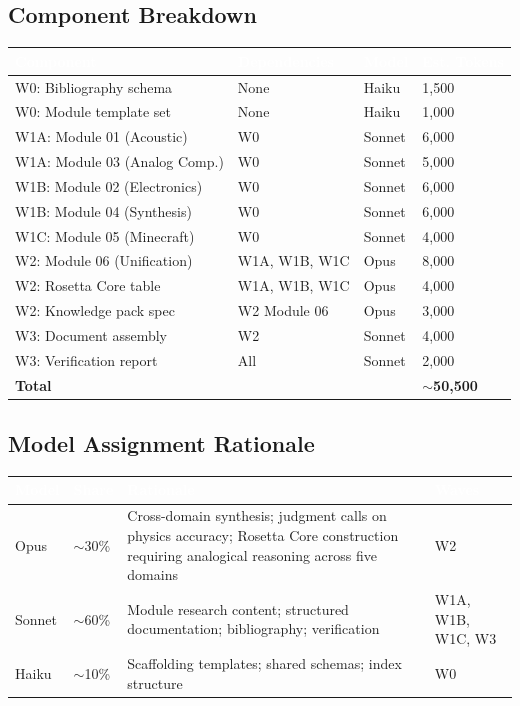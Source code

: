 \documentclass[11pt,letterpaper]{article}
\newcommand{\tableheader}[1]{\textbf{\sffamily\textcolor{white}{#1}}}
\begin{document}
\subsection{Component Breakdown}

\begin{center}
\begin{tabularx}{\textwidth}{L{4cm}L{3cm}C{2cm}C{2cm}}
\toprule
{}
\tableheader{Component} & \tableheader{Dependencies} & \tableheader{Model} & \tableheader{Est. Tokens} \\
\midrule
W0: Bibliography schema & None & Haiku & 1,500 \\
W0: Module template set & None & Haiku & 1,000 \\
W1A: Module 01 (Acoustic) & W0 & Sonnet & 6,000 \\
W1A: Module 03 (Analog Comp.) & W0 & Sonnet & 5,000 \\
W1B: Module 02 (Electronics) & W0 & Sonnet & 6,000 \\
W1B: Module 04 (Synthesis) & W0 & Sonnet & 6,000 \\
W1C: Module 05 (Minecraft) & W0 & Sonnet & 4,000 \\
W2: Module 06 (Unification) & W1A, W1B, W1C & Opus & 8,000 \\
W2: Rosetta Core table & W1A, W1B, W1C & Opus & 4,000 \\
W2: Knowledge pack spec & W2 Module 06 & Opus & 3,000 \\
W3: Document assembly & W2 & Sonnet & 4,000 \\
W3: Verification report & All & Sonnet & 2,000 \\
\hline
\textbf{Total} & & & \textbf{$\sim$50,500} \\
\bottomrule
\end{tabularx}
\end{center}

\subsection{Model Assignment Rationale}

\begin{center}
\begin{tabularx}{\textwidth}{L{2.5cm}C{1.5cm}XC{1.5cm}}
\toprule
{}
\tableheader{Model} & \tableheader{Share} & \tableheader{Rationale} & \tableheader{Waves} \\
\midrule
Opus & $\sim$30\% & Cross-domain synthesis; judgment calls on physics accuracy; Rosetta Core construction requiring analogical reasoning across five domains & W2 \\
Sonnet & $\sim$60\% & Module research content; structured documentation; bibliography; verification & W1A, W1B, W1C, W3 \\
Haiku & $\sim$10\% & Scaffolding templates; shared schemas; index structure & W0 \\
\bottomrule
\end{tabularx}
\end{center}
\end{document}
